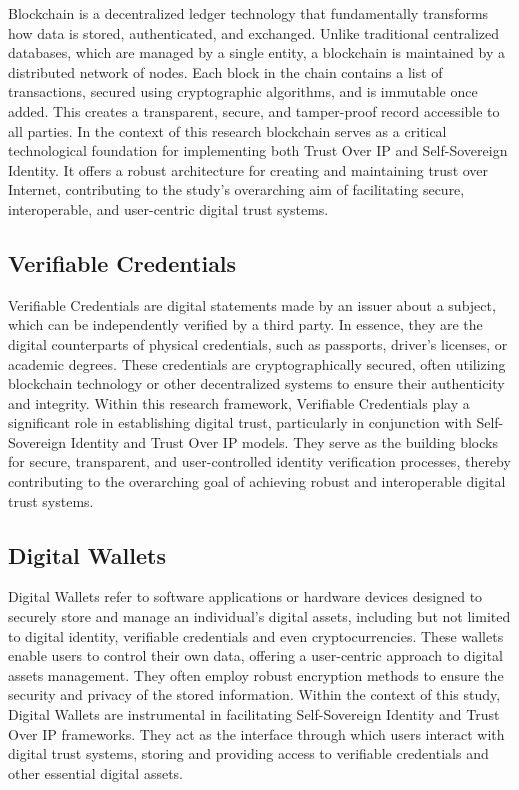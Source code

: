 Blockchain is a decentralized ledger technology that fundamentally transforms how data is stored, authenticated, and exchanged. Unlike traditional centralized databases, which are managed by a single entity, a blockchain is maintained by a distributed network of nodes. Each block in the chain contains a list of transactions, secured using cryptographic algorithms, and is immutable once added. This creates a transparent, secure, and tamper-proof record accessible to all parties. In the context of this research blockchain serves as a critical technological foundation for implementing both Trust Over IP and Self-Sovereign Identity. It offers a robust architecture for creating and maintaining trust over Internet, contributing to the study's overarching aim of facilitating secure, interoperable, and user-centric digital trust systems.

\subsection{Verifiable Credentials}

Verifiable Credentials are digital statements made by an issuer about a subject, which can be independently verified by a third party. In essence, they are the digital counterparts of physical credentials, such as passports, driver's licenses, or academic degrees. These credentials are cryptographically secured, often utilizing blockchain technology or other decentralized systems to ensure their authenticity and integrity. Within this research framework, Verifiable Credentials play a significant role in establishing digital trust, particularly in conjunction with Self-Sovereign Identity and Trust Over IP models. They serve as the building blocks for secure, transparent, and user-controlled identity verification processes, thereby contributing to the overarching goal of achieving robust and interoperable digital trust systems.

\subsection{Digital Wallets}

Digital Wallets refer to software applications or hardware devices designed to securely store and manage an individual's digital assets, including but not limited to digital identity, verifiable credentials and even cryptocurrencies. These wallets enable users to control their own data, offering a user-centric approach to digital assets management. They often employ robust encryption methods to ensure the security and privacy of the stored information. Within the context of this study, Digital Wallets are instrumental in facilitating Self-Sovereign Identity and Trust Over IP frameworks. They act as the interface through which users interact with digital trust systems, storing and providing access to verifiable credentials and other essential digital assets.

